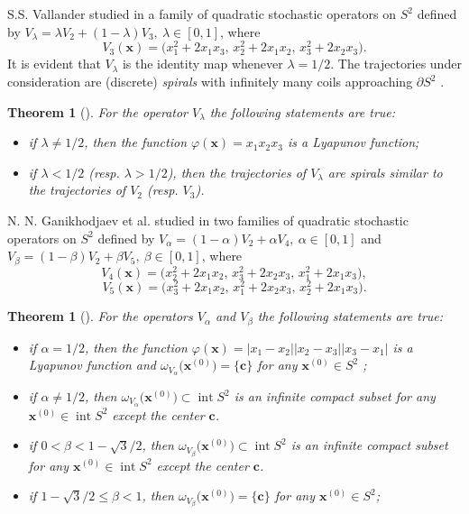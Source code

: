 \documentclass[11pt,reqno]{amsart}
\newtheorem{theorem}[subsection]{Theorem}
\numberwithin{equation}{section} \setcounter{tocdepth}{1}
\DeclareMathOperator{\inte}{int}
\begin{document}
S.S. Vallander  studied in \cite{Vsp} a family of quadratic stochastic operators on $S^2$ defined by
$V_\lambda = \lambda V_2 + (1 -\lambda)V_3, \  \lambda \in [0, 1]$,  where
\[V_3(\mathbf{x}) = \big(x^2_1+ 2x_1x_3, \,  x^2_2+ 2x_1x_2, \,  x^2_3 + 2x_2x_3\big).\]
It is evident that $V_\lambda$ is the identity map whenever $\lambda = 1/2$. The trajectories under
consideration are (discrete) \emph{spirals} with infinitely many coils approaching $\partial S^2$ \cite{Vdan}.

\begin{theorem} [\cite{Vsp}] For the operator $V_\lambda$ the following statements are true:
\begin{itemize}
\item[i)] if $\lambda \neq 1/2$, then the function $\varphi(\mathbf{x}) = x_1x_2x_3$ is a Lyapunov function;
\item[ii)] if $\lambda < 1/2$ (resp. $\lambda > 1/2$), then the trajectories of $V_\lambda$ are spirals similar to the
trajectories of $V_2$ (resp. $V_3$).
\end{itemize}
\end{theorem}

N. N. Ganikhodjaev et al.  studied in \cite{GSN} two families of quadratic stochastic operators
on $S^2$ defined by $V_\alpha = (1 -\alpha) V_2 +\alpha V_4,  \ \alpha \in [0, 1]$  and $V_\beta = (1 -\beta) V_2 +\beta V_5, \  \beta \in [0, 1]$,  where
\[V_4(\mathbf{x}) = \big(x^2_2+ 2x_1x_2, \,  x^2_3+ 2x_2x_3, \,  x^2_1 + 2x_1x_3\big),\]
\[V_5(\mathbf{x}) = \big(x^2_3+ 2x_1x_2, \,  x^2_1+ 2x_2x_3, \,  x^2_2 + 2x_1x_3\big).\]
\begin{theorem}[\cite{GSN}] For the operators $V_\alpha$ and $V_\beta$ the following statements are true:
\begin{itemize}
\item[i)] if $\alpha = 1/2$, then the function  $\varphi(\mathbf{x}) = |x_1-x_2||x_2-x_3||x_3-x_1|$ is a Lyapunov
function and $\omega_{V_\alpha} \big(\mathbf{x}^{(0)}\big)=\{\mathbf{c}\}$ for any $\mathbf{x}^{(0)}\in S^2$ ;
\item[ii)] if $\alpha \neq 1/2$, then $\omega_{V_\alpha} \big(\mathbf{x}^{(0)}\big)\subset \inte S^2$ is an infinite compact subset for any
$\mathbf{x}^{(0)}\in \inte S^2$ except the center $\mathbf{c}$.
\item[iii)] if $0 < \beta < 1 -\sqrt{3}/2$, then $\omega_{V_\beta} \big(\mathbf{x}^{(0)}\big)\subset \inte S^2$ is an infinite compact subset for any
$\mathbf{x}^{(0)}\in \inte S^2$ except the center $\mathbf{c}$.
\item[iv)] if $1 -\sqrt{3}/2\leq \beta < 1$, then $\omega_{V_\beta} \big(\mathbf{x}^{(0)}\big)=\{\mathbf{c}\}$ for any $\mathbf{x}^{(0)}\in S^2$;
\end{itemize}
\end{theorem}
\end{document}
